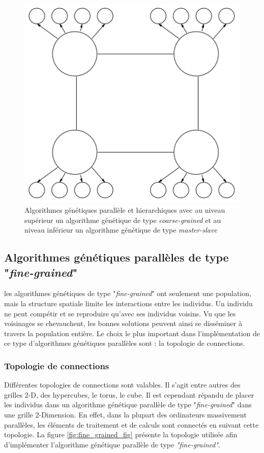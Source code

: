 \documentclass[12pt,a4paper]{article}
\begin{document}
	\begin{figure}[!h]
		\begin{center}
			\includegraphics[scale=.3]{img/hierarchical_gene1_fig.png}
			\caption{Algorithmes génétiques parallèle et hierarchiques avec au niveau supérieur un algorithme génétique de type \emph{coarse-grained} et au niveau inférieur un algorithme génétique de type \emph{master-slave}}
			\label{fig:hierarchical_gene1_fig}
		\end{center}
	\end{figure} 	
 	
	\subsection{Algorithmes génétiques parallèles de type "\emph{fine-grained}"}
	les algorithmes génétiques de type "\emph{fine-grained}" ont seulement une population, mais la structure spatiale limite les interactions entre les individus. Un individu ne peut compétir et se reproduire qu'avec ses individus voisins. Vu que les voisinages se chevauchent, les bonnes solutions peuvent ainsi se disséminer à travers la population entière. Le choix le plus important dans l'implémentation de ce type d'algorithmes génétiques parallèles sont : la topologie de connections.
	\subsubsection{Topologie de connections}
	Différentes topologies de connections sont valables. Il s'agit entre autres des grilles 2-D, des hypercubes, le torus, le cube. Il est cependant répandu de placer les individus dans un algorithme génétique parallèle de type "\emph{fine-grained}" dans une grille 2-Dimension. En effet, dans la plupart des ordinateurs massivement parallèles, les éléments de traitement et de calculs sont connectés en suivant cette topologie. La figure \ref{fig:fine_grained_fig} présente la topologie utilisée afin d'implémenter l'algorithme génétique parallèle de type \emph{"fine-grained"}.
	
\end{document}
